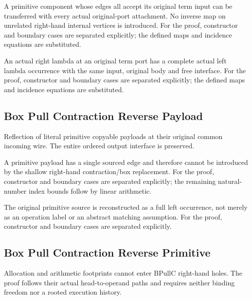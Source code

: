 A primitive component whose edges all accept its original term input can be transferred with every actual original-port attachment. No inverse map on unrelated right-hand internal vertices is introduced.
For the proof, constructor and boundary cases are separated explicitly; the defined maps and incidence equations are substituted.
\par{}

An actual right lambda at an original term port has a complete actual left lambda occurrence with the same input, original body and free interface.
For the proof, constructor and boundary cases are separated explicitly; the defined maps and incidence equations are substituted.
\par{}

\subsection{Box Pull Contraction Reverse Payload}
Reflection of literal primitive copyable payloads at their original common incoming wire. The entire ordered output interface is preserved.

A primitive payload has a single sourced edge and therefore cannot be introduced by the shallow right-hand contraction/box replacement.
For the proof, constructor and boundary cases are separated explicitly; the remaining natural-number index bounds follow by linear arithmetic.
\par{}

The original primitive source is reconstructed as a full left occurrence, not merely as an operation label or an abstract matching assumption.
For the proof, constructor and boundary cases are separated explicitly.
\par{}

\subsection{Box Pull Contraction Reverse Primitive}
Allocation and arithmetic footprints cannot enter BPullC right-hand holes. The proof follows their actual head-to-operand paths and requires neither binding freedom nor a rooted execution history.

